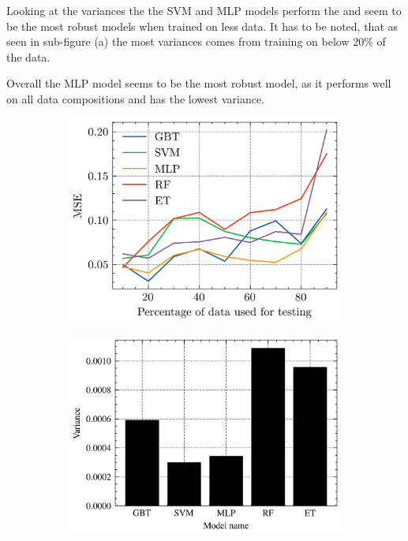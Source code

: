 Looking at the variances the the \ac{SVM} and \ac{MLP} models perform the and seem to be the most
robust models when trained on less data.
It has to be noted, that as seen in sub-figure (a) the most variances comes from training on
below 20\% of the data.

Overall the \ac{MLP} model seems to be the most robust model, as it performs well on all data
compositions and has the lowest variance.

\begin{figure}[H]
    \begin{tcolorbox}[arc=0pt,boxrule=0.5pt]
        \centering
        \begin{subfigure}{0.4\textwidth}
            \includegraphics[width=\textwidth]{chap5/images/missing_values_plot}
            \caption{}
            \label{fig:first}
        \end{subfigure}
        \hfill
        \begin{subfigure}{0.4\textwidth}
            \includegraphics[width=\textwidth]{chap5/images/variance_missing_values}

\end{subfigure}
\end{tcolorbox}
\end{figure}
